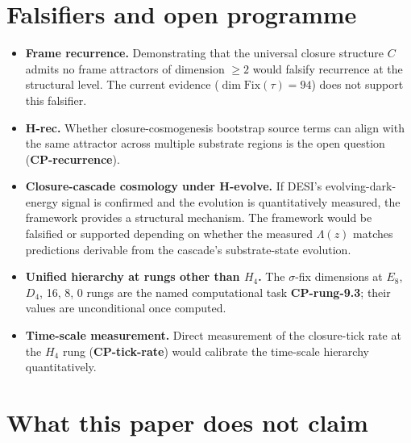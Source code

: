 \documentclass[11pt]{article}
\theoremstyle{plain}
\theoremstyle{definition}
\theoremstyle{remark}
\newcommand{\Fix}{\mathrm{Fix}}
\begin{document}
\section{Falsifiers and open programme}\label{sec:falsifiers}

\begin{itemize}[leftmargin=2em]
\item \textbf{Frame recurrence.} Demonstrating that the universal closure structure $C$ admits no frame attractors of dimension $\geq 2$ would falsify recurrence at the structural level. The current evidence ($\dim \Fix(\tau) = 94$) does not support this falsifier.
\item \textbf{H-rec.} Whether closure-cosmogenesis bootstrap source terms can align with the same attractor across multiple substrate regions is the open question (\textbf{CP-recurrence}).
\item \textbf{Closure-cascade cosmology under H-evolve.} If DESI's evolving-dark-energy signal is confirmed and the evolution is quantitatively measured, the framework provides a structural mechanism. The framework would be falsified or supported depending on whether the measured $\Lambda(z)$ matches predictions derivable from the cascade's substrate-state evolution.
\item \textbf{Unified hierarchy at rungs other than $H_4$.} The $\sigma$-fix dimensions at $E_8$, $D_4$, 16, 8, 0 rungs are the named computational task \textbf{CP-rung-9.3}; their values are unconditional once computed.
\item \textbf{Time-scale measurement.} Direct measurement of the closure-tick rate at the $H_4$ rung (\textbf{CP-tick-rate}) would calibrate the time-scale hierarchy quantitatively.
\end{itemize}

\section{What this paper does not claim}\label{sec:scope}
\end{document}
